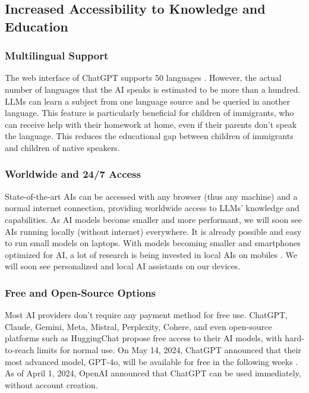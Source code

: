 \documentclass{article}
\begin{document}
\subsection{Increased Accessibility to Knowledge and Education}

\subsubsection{Multilingual Support}

The web interface of ChatGPT supports 50 languages \cite{openai_language_setting}. However, the actual number of languages that the AI speaks is estimated to be more than a hundred. LLMs can learn a subject from one language source and be queried in another language. This feature is particularly beneficial for children of immigrants, who can receive help with their homework at home, even if their parents don't speak the language. This reduces the educational gap between children of immigrants and children of native speakers.

\subsubsection{Worldwide and 24/7 Access}

State-of-the-art AIs can be accessed with any browser (thus any machine) and a normal internet connection, providing worldwide access to LLMs' knowledge and capabilities. As AI models become smaller and more performant, we will soon see AIs running locally (without internet) everywhere. It is already possible and easy to run small models on laptops. With models becoming smaller and smartphones optimized for AI, a lot of research is being invested in local AIs on mobiles \cite{liu2024mobilellm}. We will soon see personalized and local AI assistants on our devices.

\subsubsection{Free and Open-Source Options}

Most AI providers don't require any payment method for free use. ChatGPT, Claude, Gemini, Meta, Mistral, Perplexity, Cohere, and even open-source platforms such as HuggingChat propose free access to their AI models, with hard-to-reach limits for normal use. On May 14, 2024, ChatGPT announced that their most advanced model, GPT-4o, will be available for free in the following weeks \cite{https://openai.com/index/hello-gpt-4o/}. As of April 1, 2024, OpenAI announced that ChatGPT can be used immediately, without account creation.
\end{document}
